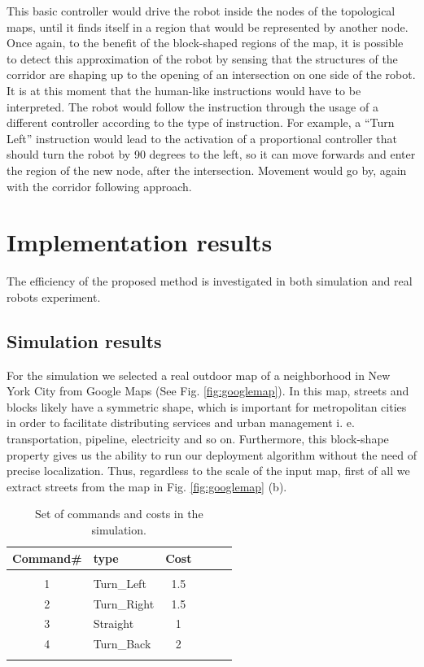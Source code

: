 \documentclass[twocolumn]{svjour3}       %
\begin{document}
This basic controller would drive the robot inside the nodes of the topological maps, until it finds itself in a region that would be represented by another node. Once again, to the benefit of the block-shaped regions of the map, it is possible to detect this approximation of the robot by sensing that the structures of the corridor are shaping up to the opening of an intersection on one side of the robot. It is at this moment that the human-like instructions would have to be interpreted. The robot would follow the instruction through the usage of a different controller according to the type of instruction. For example, a ``Turn Left'' instruction would lead to the activation of a proportional controller that should turn the robot by 90 degrees to the left, so it can move forwards and enter the region of the new node, after the intersection. Movement would go by, again with the corridor following approach.

\section{Implementation results}
\label{sec:implementation}

The efficiency of the proposed method is investigated in both simulation and real robots experiment.

\subsection{Simulation results}
%
For the simulation we selected a real outdoor map of a neighborhood in New York City from Google Maps (See Fig. \ref{fig:googlemap}). In this map, streets and blocks likely have a symmetric shape, which is important for metropolitan cities in order to facilitate distributing services and urban management i. e. transportation, pipeline, electricity and so on. Furthermore, this block-shape property gives us the ability to run our deployment algorithm without the need of precise localization. Thus, regardless to the scale of the input map, first of all we extract streets from the map in Fig. \ref{fig:googlemap} (b). 

\begin{table}[t]
\centering
\caption{Set of commands and costs in the simulation.}
\label{tbl:commandsets}
\begin{tabular}{cm{1.5cm}cm{1.9cm}cm{1.8cm}}
Command\#  & type  & Cost    \\
\hline\\
1 & Turn\_Left &  1.5 \\
2 & Turn\_Right& 1.5\\
3 & Straight &  1\\
4 & Turn\_Back & 2\\
\hline\\
\end{tabular}
\end{table}
\end{document}

